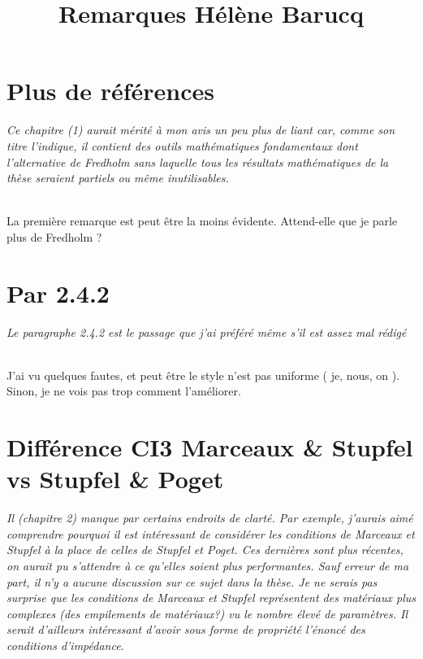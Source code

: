 \documentclass{article}
\title{Remarques Hélène Barucq}
\date{}
\newenvironment{REM}{\itshape}{}
\newenvironment{REP}{~{}\\}{}
\begin{document}
\maketitle

\section{Plus de références}
\begin{REM}
    Ce chapitre (1) aurait mérité à mon avis un peu plus de liant car, comme son titre l’indique, il contient des outils mathématiques fondamentaux dont l’alternative de Fredholm sans laquelle tous les résultats mathématiques de la thèse seraient partiels ou même inutilisables.
\end{REM}

\begin{REP}
    La première remarque est peut être la moins évidente.
    Attend-elle que je parle plus de Fredholm ?
\end{REP}

\section{Par 2.4.2}
\begin{REM}
    Le paragraphe 2.4.2 est le passage que j’ai préféré même s’il est assez mal rédigé
\end{REM}

\begin{REP}
    J'ai vu quelques fautes, et peut être le style n'est pas uniforme (  je,  nous,  on ). Sinon, je ne vois pas trop comment l'améliorer.
\end{REP}

\section{Différence CI3 Marceaux \& Stupfel vs Stupfel \& Poget}
\begin{REM}
    Il (chapitre 2) manque par certains endroits de clarté.
    Par exemple, j’aurais aimé comprendre pourquoi il est intéressant de considérer les conditions de Marceaux et Stupfel à la place de celles de Stupfel et Poget.
    Ces dernières sont plus récentes, on aurait pu s’attendre à ce qu’elles soient plus performantes.
    Sauf erreur de ma part, il n’y a aucune discussion sur ce sujet dans la thèse.
    Je ne serais pas surprise que les conditions de Marceaux et Stupfel représentent des matériaux plus complexes (des empilements de matériaux?) vu le nombre élevé de paramètres.
    Il serait d’ailleurs intéressant d’avoir sous forme de propriété l’énoncé des conditions d’impédance.
\end{REM}
\end{document}
